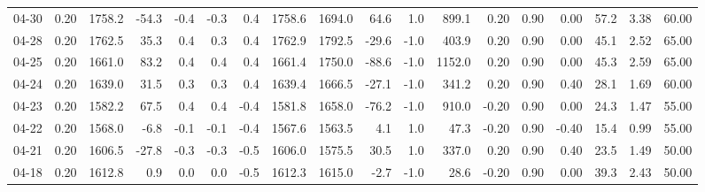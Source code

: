 \begin{threeparttable}
{\begin{tabular}{lrrrrrrrrrrrrrrrrr}
  04-30 &     0.20 & 1758.2 &             -54.3 &              -0.4 &               -0.3 &                0.4 & 1758.6 & 1694.0 &       64.6 &                      1.0 &               899.1 &       0.20 &      0.90 &           0.00 &             57.2 &            3.38 &                  60.00 \\
  04-28 &     0.20 & 1762.5 &              35.3 &               0.4 &                0.3 &                0.4 & 1762.9 & 1792.5 &      -29.6 &                     -1.0 &               403.9 &       0.20 &      0.90 &           0.00 &             45.1 &            2.52 &                  65.00 \\
  04-25 &     0.20 & 1661.0 &              83.2 &               0.4 &                0.4 &                0.4 & 1661.4 & 1750.0 &      -88.6 &                     -1.0 &              1152.0 &       0.20 &      0.90 &           0.00 &             45.3 &            2.59 &                  65.00 \\
  04-24 &     0.20 & 1639.0 &              31.5 &               0.3 &                0.3 &                0.4 & 1639.4 & 1666.5 &      -27.1 &                     -1.0 &               341.2 &       0.20 &      0.90 &           0.40 &             28.1 &            1.69 &                  60.00 \\
  04-23 &     0.20 & 1582.2 &              67.5 &               0.4 &                0.4 &               -0.4 & 1581.8 & 1658.0 &      -76.2 &                     -1.0 &               910.0 &      -0.20 &      0.90 &           0.00 &             24.3 &            1.47 &                  55.00 \\
  04-22 &     0.20 & 1568.0 &              -6.8 &              -0.1 &               -0.1 &               -0.4 & 1567.6 & 1563.5 &        4.1 &                      1.0 &                47.3 &      -0.20 &      0.90 &          -0.40 &             15.4 &            0.99 &                  55.00 \\
  04-21 &     0.20 & 1606.5 &             -27.8 &              -0.3 &               -0.3 &               -0.5 & 1606.0 & 1575.5 &       30.5 &                      1.0 &               337.0 &       0.20 &      0.90 &           0.40 &             23.5 &            1.49 &                  50.00 \\
  04-18 &     0.20 & 1612.8 &               0.9 &               0.0 &                0.0 &               -0.5 & 1612.3 & 1615.0 &       -2.7 &                     -1.0 &                28.6 &      -0.20 &      0.90 &           0.00 &             39.3 &            2.43 &                  50.00 \\

\end{tabular}}
\end{threeparttable}
